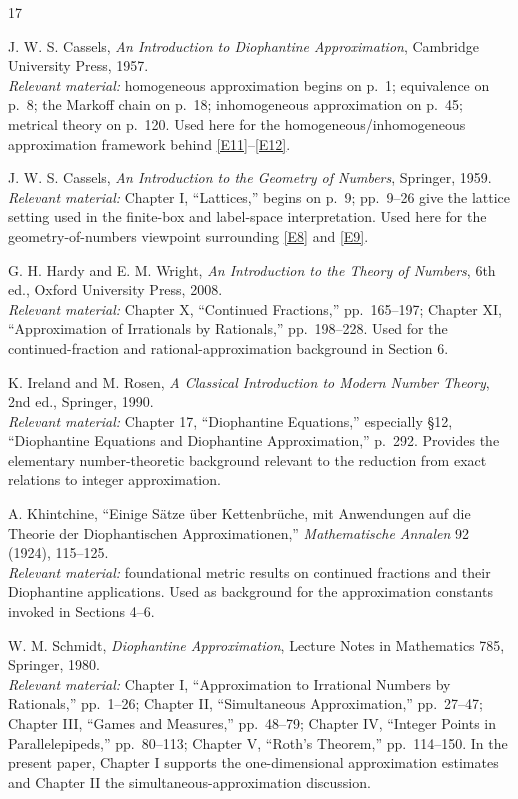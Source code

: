 \documentclass[12pt]{article}
\begin{document}
\begin{thebibliography}{17}

J. W. S. Cassels, \emph{An Introduction to Diophantine Approximation}, Cambridge University Press, 1957.\\
\textit{Relevant material:} homogeneous approximation begins on p.~1; equivalence on p.~8; the Markoff chain on p.~18; inhomogeneous approximation on p.~45; metrical theory on p.~120. Used here for the homogeneous/inhomogeneous approximation framework behind \eqref{E11}--\eqref{E12}.

J. W. S. Cassels, \emph{An Introduction to the Geometry of Numbers}, Springer, 1959.\\
\textit{Relevant material:} Chapter I, ``Lattices,'' begins on p.~9; pp.~9--26 give the lattice setting used in the finite-box and label-space interpretation. Used here for the geometry-of-numbers viewpoint surrounding \eqref{E8} and \eqref{E9}.

G. H. Hardy and E. M. Wright, \emph{An Introduction to the Theory of Numbers}, 6th ed., Oxford University Press, 2008.\\
\textit{Relevant material:} Chapter X, ``Continued Fractions,'' pp.~165--197; Chapter XI, ``Approximation of Irrationals by Rationals,'' pp.~198--228. Used for the continued-fraction and rational-approximation background in Section 6.

K. Ireland and M. Rosen, \emph{A Classical Introduction to Modern Number Theory}, 2nd ed., Springer, 1990.\\
\textit{Relevant material:} Chapter 17, ``Diophantine Equations,'' especially \S12, ``Diophantine Equations and Diophantine Approximation,'' p.~292. Provides the elementary number-theoretic background relevant to the reduction from exact relations to integer approximation.

A. Khintchine, ``Einige Sätze über Kettenbrüche, mit Anwendungen auf die Theorie der Diophantischen Approximationen,'' \emph{Mathematische Annalen} 92 (1924), 115--125.\\
\textit{Relevant material:} foundational metric results on continued fractions and their Diophantine applications. Used as background for the approximation constants invoked in Sections 4--6.

W. M. Schmidt, \emph{Diophantine Approximation}, Lecture Notes in Mathematics 785, Springer, 1980.\\
\textit{Relevant material:} Chapter I, ``Approximation to Irrational Numbers by Rationals,'' pp.~1--26; Chapter II, ``Simultaneous Approximation,'' pp.~27--47; Chapter III, ``Games and Measures,'' pp.~48--79; Chapter IV, ``Integer Points in Parallelepipeds,'' pp.~80--113; Chapter V, ``Roth's Theorem,'' pp.~114--150. In the present paper, Chapter I supports the one-dimensional approximation estimates and Chapter II the simultaneous-approximation discussion.


\end{thebibliography}
\end{document}
